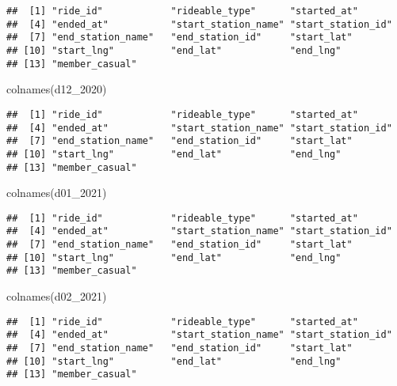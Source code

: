 \documentclass[
]{article}
\newenvironment{Shaded}{\begin{snugshade}}{\end{snugshade}}
\newcommand{\FunctionTok}[1]{\textcolor[rgb]{0.00,0.00,0.00}{#1}}
\newcommand{\NormalTok}[1]{#1}
\begin{document}
\begin{verbatim}
##  [1] "ride_id"            "rideable_type"      "started_at"        
##  [4] "ended_at"           "start_station_name" "start_station_id"  
##  [7] "end_station_name"   "end_station_id"     "start_lat"         
## [10] "start_lng"          "end_lat"            "end_lng"           
## [13] "member_casual"
\end{verbatim}

\begin{Shaded}
\begin{Highlighting}[]
\FunctionTok{colnames}\NormalTok{(d12\_2020)}
\end{Highlighting}
\end{Shaded}

\begin{verbatim}
##  [1] "ride_id"            "rideable_type"      "started_at"        
##  [4] "ended_at"           "start_station_name" "start_station_id"  
##  [7] "end_station_name"   "end_station_id"     "start_lat"         
## [10] "start_lng"          "end_lat"            "end_lng"           
## [13] "member_casual"
\end{verbatim}

\begin{Shaded}
\begin{Highlighting}[]
\FunctionTok{colnames}\NormalTok{(d01\_2021)}
\end{Highlighting}
\end{Shaded}

\begin{verbatim}
##  [1] "ride_id"            "rideable_type"      "started_at"        
##  [4] "ended_at"           "start_station_name" "start_station_id"  
##  [7] "end_station_name"   "end_station_id"     "start_lat"         
## [10] "start_lng"          "end_lat"            "end_lng"           
## [13] "member_casual"
\end{verbatim}

\begin{Shaded}
\begin{Highlighting}[]
\FunctionTok{colnames}\NormalTok{(d02\_2021)}
\end{Highlighting}
\end{Shaded}

\begin{verbatim}
##  [1] "ride_id"            "rideable_type"      "started_at"        
##  [4] "ended_at"           "start_station_name" "start_station_id"  
##  [7] "end_station_name"   "end_station_id"     "start_lat"         
## [10] "start_lng"          "end_lat"            "end_lng"           
## [13] "member_casual"
\end{verbatim}
\end{document}
